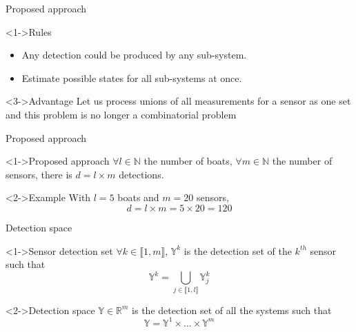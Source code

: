 \documentclass{beamer}
\begin{document}
        \begin{frame}{Proposed approach}
            \begin{block}<1->{\alert{Rules}}
                \begin{itemize}
                    \item Any detection could be produced by any sub-system.
                    \item Estimate possible states for all sub-systems at once.
                \end{itemize}
            \end{block}
            \begin{block}<3->{Advantage}
                Let us process unions of all measurements for a sensor as one set and this problem is no longer a combinatorial problem
            \end{block}
        \end{frame}

        \begin{frame}{Proposed approach}
            \begin{block}<1->{Proposed approach}
                $\forall l \in \mathbb{N}$ the number of boats, $\forall m \in \mathbb{N}$ the number of sensors, there is $d = l \times m$ detections.
            \end{block}
            \begin{exampleblock}<2->{Example}
                With $l = 5$ boats and $m = 20$ sensors,
                $$d = l \times m = 5 \times 20 = 120$$
            \end{exampleblock}
        \end{frame}

        \begin{frame}{Detection space}
            \begin{block}<1->{Sensor detection set}
                $\forall k \in \llbracket 1, m\rrbracket$, $\mathbb{Y}^k$ is the detection set of the $k^{th}$ sensor such that
                \begin{equation}
                    \mathbb{Y}^k = \bigcup_{j \in \llbracket 1, l\rrbracket} \mathbb{Y}_j^k
                \end{equation}
            \end{block}
            \begin{block}<2->{Detection space}
                $\mathbb{Y} \in \mathbb{R}^m$ is the detection set of all the systems such that
                \begin{equation}
                    \mathbb{Y} = \mathbb{Y}^1 \times \dots \times \mathbb{Y}^m
                \end{equation}
            \end{block}
        \end{frame}
\end{document}
